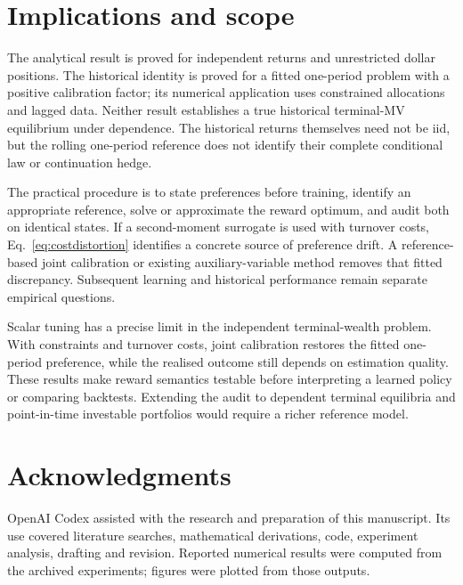 \documentclass[sigconf,review]{acmart}
\begin{document}
\section{Implications and scope}
The analytical result is proved for independent returns and unrestricted dollar positions. The historical identity is proved for a fitted one-period problem with a positive calibration factor; its numerical application uses constrained allocations and lagged data. Neither result establishes a true historical terminal-MV equilibrium under dependence. The historical returns themselves need not be iid, but the rolling one-period reference does not identify their complete conditional law or continuation hedge.

The practical procedure is to state preferences before training, identify an appropriate reference, solve or approximate the reward optimum, and audit both on identical states. If a second-moment surrogate is used with turnover costs, Eq.\ \eqref{eq:costdistortion} identifies a concrete source of preference drift. A reference-based joint calibration or existing auxiliary-variable method removes that fitted discrepancy. Subsequent learning and historical performance remain separate empirical questions.

Scalar tuning has a precise limit in the independent terminal-wealth problem. With constraints and turnover costs, joint calibration restores the fitted one-period preference, while the realised outcome still depends on estimation quality. These results make reward semantics testable before interpreting a learned policy or comparing backtests. Extending the audit to dependent terminal equilibria and point-in-time investable portfolios would require a richer reference model.

\section*{Acknowledgments}
OpenAI Codex assisted with the research and preparation of this manuscript. Its use covered literature searches, mathematical derivations, code, experiment analysis, drafting and revision. Reported numerical results were computed from the archived experiments; figures were plotted from those outputs.

\clearpage


\end{document}
